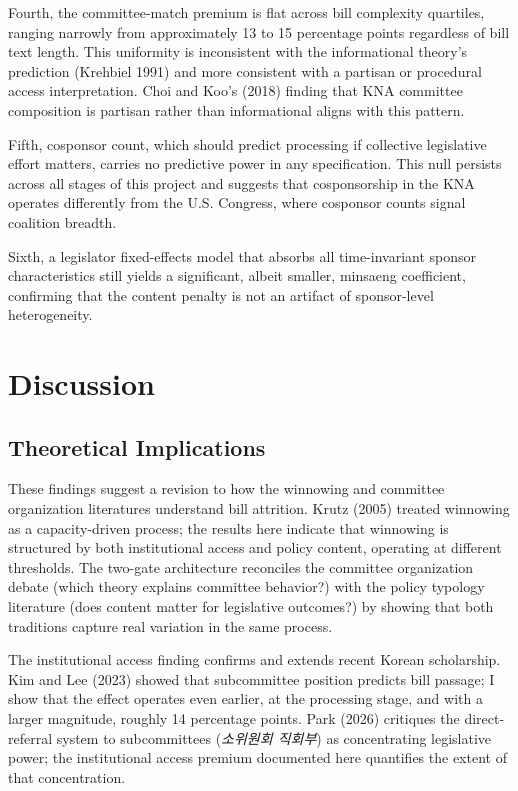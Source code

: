 \documentclass[11pt]{article}
\begin{document}
Fourth, the committee-match premium is flat across bill complexity quartiles, ranging narrowly from approximately 13 to 15 percentage points regardless of bill text length. This uniformity is inconsistent with the informational theory's prediction (Krehbiel 1991) and more consistent with a partisan or procedural access interpretation. Choi and Koo's (2018) finding that KNA committee composition is partisan rather than informational aligns with this pattern.

Fifth, cosponsor count, which should predict processing if collective legislative effort matters, carries no predictive power in any specification. This null persists across all stages of this project and suggests that cosponsorship in the KNA operates differently from the U.S. Congress, where cosponsor counts signal coalition breadth.

Sixth, a legislator fixed-effects model that absorbs all time-invariant sponsor characteristics still yields a significant, albeit smaller, minsaeng coefficient, confirming that the content penalty is not an artifact of sponsor-level heterogeneity.


\section{Discussion}

\subsection{Theoretical Implications}

These findings suggest a revision to how the winnowing and committee organization literatures understand bill attrition. Krutz (2005) treated winnowing as a capacity-driven process; the results here indicate that winnowing is structured by both institutional access and policy content, operating at different thresholds. The two-gate architecture reconciles the committee organization debate (which theory explains committee behavior?) with the policy typology literature (does content matter for legislative outcomes?) by showing that both traditions capture real variation in the same process.

The institutional access finding confirms and extends recent Korean scholarship. Kim and Lee (2023) showed that subcommittee position predicts bill passage; I show that the effect operates even earlier, at the processing stage, and with a larger magnitude, roughly 14 percentage points. Park (2026) critiques the direct-referral system to subcommittees (\emph{소위원회 직회부}) as concentrating legislative power; the institutional access premium documented here quantifies the extent of that concentration.
\end{document}
